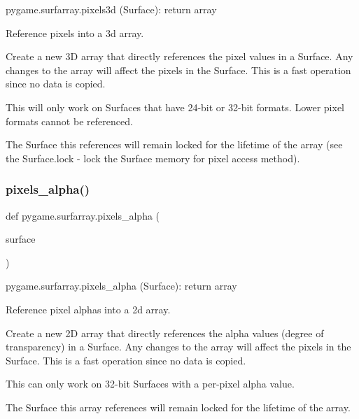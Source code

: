 \begin{DoxyVerb}pygame.surfarray.pixels3d (Surface): return array

Reference pixels into a 3d array.

Create a new 3D array that directly references the pixel values in a
Surface. Any changes to the array will affect the pixels in the
Surface. This is a fast operation since no data is copied.

This will only work on Surfaces that have 24-bit or 32-bit
formats. Lower pixel formats cannot be referenced.

The Surface this references will remain locked for the lifetime of
the array (see the Surface.lock - lock the Surface memory for pixel
access method).
\end{DoxyVerb}
 \mbox{\label{namespacepygame_1_1surfarray_a85328cf7f3ac0726ac48b484c4d2c5fc}} 
\subsubsection{\texorpdfstring{pixels\+\_\+alpha()}{pixels\_alpha()}}
{\footnotesize\ttfamily def pygame.\+surfarray.\+pixels\+\_\+alpha (\begin{DoxyParamCaption}\item[{}]{surface }\end{DoxyParamCaption})}

\begin{DoxyVerb}pygame.surfarray.pixels_alpha (Surface): return array

Reference pixel alphas into a 2d array.

Create a new 2D array that directly references the alpha values
(degree of transparency) in a Surface. Any changes to the array will
affect the pixels in the Surface. This is a fast operation since no
data is copied.

This can only work on 32-bit Surfaces with a per-pixel alpha value.

The Surface this array references will remain locked for the
lifetime of the array.
\end{DoxyVerb}
 \mbox{\label{namespacepygame_1_1surfarray_a3268a46e4e06b19e4b91559cbda57cae}} 
